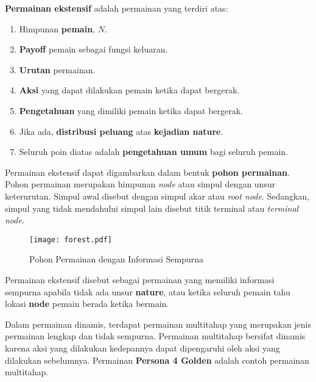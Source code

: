 \begin{definisi}
    \textbf{Permainan ekstensif} adalah permainan yang terdiri atas:
    \begin{enumerate}
        \item Himpunan \textbf{pemain}, $N$.
        \item \textbf{Payoff} pemain sebagai fungsi keluaran.
        \item \textbf{Urutan} permainan.
        \item \textbf{Aksi} yang dapat dilakukan pemain ketika dapat bergerak.
        \item \textbf{Pengetahuan} yang dimiliki pemain ketika dapat bergerak.
        \item Jika ada, \textbf{distribusi peluang} atas \textbf{kejadian nature}.
        \item Seluruh poin diatas adalah \textbf{pengetahuan umum} bagi seluruh pemain.
    \end{enumerate}
\end{definisi}

Permainan ekstensif dapat digambarkan dalam bentuk \textbf{pohon permainan}. Pohon permainan merupakan himpunan \textit{node} atau simpul dengan unsur keterurutan. Simpul awal disebut dengan simpul akar atau \textit{root node}. Sedangkan, simpul yang tidak mendahului simpul lain disebut titik terminal atau \textit{terminal node}.

\begin{figure}[h]
    \centering
    \texttt{[image: forest.pdf]}
    \caption{Pohon Permainan dengan Informasi Sempurna}
\end{figure}

\begin{definisi}
    Permainan ekstensif disebut sebagai permainan yang memiliki informasi sempurna apabila tidak ada unsur \textbf{nature}, atau ketika seluruh pemain tahu lokasi \textbf{node} pemain berada ketika bermain.
\end{definisi}

\pagebreak
Dalam permainan dinamis, terdapat permainan multitahap yang merupakan jenis permainan lengkap dan tidak sempurna. Permainan multitahap bersifat dinamis karena aksi yang dilakukan kedepannya dapat dipengaruhi oleh aksi yang dilakukan sebelumnya. Permainan \textbf{Persona 4 Golden} adalah contoh permainan multitahap.


